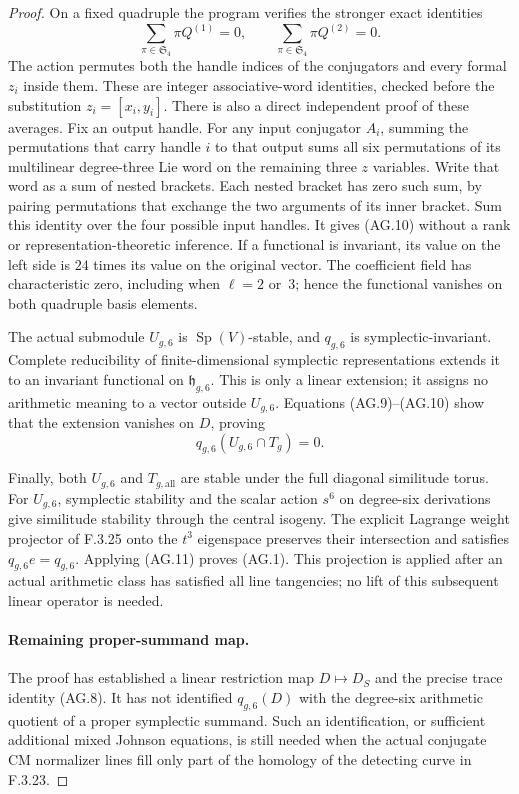 \begin{proof}
On a fixed quadruple the program verifies the
stronger exact identities
\[
       \sum_{\pi\in\mathfrak S_4}\pi Q^{(1)}=0,
       \qquad
       \sum_{\pi\in\mathfrak S_4}\pi Q^{(2)}=0.            \tag{AG.10}
\]
The action permutes both the handle indices of
the conjugators and every formal $z_i$ inside
them. These are integer associative-word
identities, checked before the substitution
$z_i=[x_i,y_i]$. There is also a direct independent
proof of these averages. Fix an output handle. For
any input conjugator $A_i$, summing the permutations
that carry handle $i$ to that output sums all six
permutations of its multilinear degree-three Lie
word on the remaining three $z$ variables. Write
that word as a sum of nested brackets. Each nested
bracket has zero such sum, by pairing permutations
that exchange the two arguments of its inner
bracket. Sum this identity over the four possible
input handles. It gives (AG.10) without a rank or
representation-theoretic inference. If a functional
is invariant, its value on the left side is $24$
times its value on the original vector. The coefficient
field has characteristic zero, including when
$\ell=2$ or~3; hence the functional vanishes
on both quadruple basis elements.

The actual submodule $U_{g,6}$ is
$\operatorname{Sp}(V)$-stable, and $q_{g,6}$
is symplectic-invariant. Complete reducibility
of finite-dimensional symplectic representations
extends it to an invariant functional on
$\mathfrak h_{g,6}$. This is only a linear
extension; it assigns no arithmetic meaning
to a vector outside $U_{g,6}$. Equations
(AG.9)--(AG.10) show that the extension
vanishes on $D$, proving
\[
                         q_{g,6}(U_{g,6}\cap T_g)=0.
                                                               \tag{AG.11}
\]

Finally, both $U_{g,6}$ and $T_{g,\mathrm{all}}$
are stable under the full diagonal similitude
torus. For $U_{g,6}$, symplectic stability and
the scalar action $s^6$ on degree-six derivations
give similitude stability through the central
isogeny. The explicit Lagrange weight projector
of F.3.25 onto the $t^3$ eigenspace preserves
their intersection and satisfies $q_{g,6}e=q_{g,6}$.
Applying (AG.11) proves (AG.1). This projection
is applied after an actual arithmetic class
has satisfied all line tangencies; no lift
of this subsequent linear operator is needed.

\paragraph{Remaining proper-summand map.}
The proof has established a linear restriction
map $D\mapsto D_S$ and the precise trace identity
(AG.8). It has not identified $q_{g,6}(D)$ with
the degree-six arithmetic quotient of a proper
symplectic summand. Such an identification, or
sufficient additional mixed Johnson equations,
is still needed when the actual conjugate CM
normalizer lines fill only part of the homology
of the detecting curve in F.3.23.

\end{proof}


